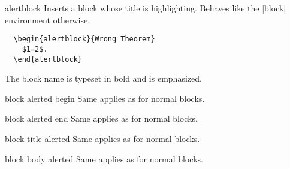 \begin{environment}{{alertblock}}
  Inserts a block whose title is highlighting. Behaves like the |block| environment otherwise.
  \example
\begin{verbatim}
  \begin{alertblock}{Wrong Theorem}
    $1=2$.
  \end{alertblock}
\end{verbatim}

  \articlenote
  The block name is typeset in bold and is emphasized.

  \begin{element}{block alerted begin}\yes\no\no
    Same applies as for normal blocks.
  \end{element}

  \begin{element}{block alerted end}\yes\no\no
    Same applies as for normal blocks.
  \end{element}

  \begin{element}{block title alerted}\no\yes\yes
    Same applies as for normal blocks.
  \end{element}

  \begin{element}{block body alerted}\no\yes\yes
    Same applies as for normal blocks.
  \end{element}
\end{environment}

